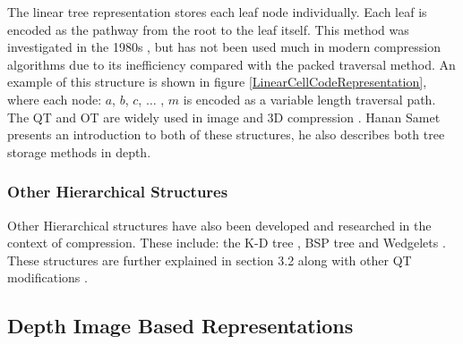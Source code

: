 The linear tree representation stores each leaf node individually. Each leaf is encoded as the pathway from the root to the leaf itself. This method was investigated in the 1980s \cite{Gargantini82Effective,Yufei88Octcodes}, but has not been used much in modern compression algorithms due to its inefficiency compared with the packed traversal method. An example of this structure is shown in figure \ref{LinearCellCodeRepresentation}, where each node: $a$, $b$, $c$, $\dots$ , $m$  is encoded as a variable length traversal path. The QT and OT are widely used in image \cite{Varma12Application} and 3D compression \cite{Schnabel06Octree}. Hanan Samet \cite{Samet88Fund1} presents an introduction to both of these structures, he also describes both tree storage methods in depth. 


\subsubsection{Other Hierarchical Structures}

Other Hierarchical structures have also been developed and researched in the context of compression. These include: the K-D tree \cite{Gandoin02Progressive}, BSP tree \cite{Radha96Image} and Wedgelets \cite{Donoho99Wedgelets,Wakin02Rate}. These structures are further explained in section 3.2 along with other QT modifications \cite{Varma12Application,Shukla05Rate,Gonzalez07ShadeTree,Kassim09Hierarchical, Lincoln13Interpolating}.


\subsection{Depth Image Based Representations}

